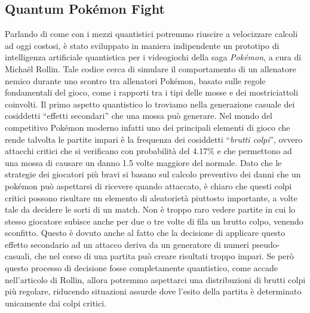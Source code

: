 \documentclass{book}
\theoremstyle{definition}
\theoremstyle{definition}
\theoremstyle{definition}
\theoremstyle{plain}
\theoremstyle{plain}
\theoremstyle{plain}
\theoremstyle{plain}
\begin{document}
\subsection{Quantum Pokémon Fight}
Parlando di come con i mezzi quantistici potremmo riuscire a velocizzare calcoli ad oggi costosi, è stato sviluppato in maniera indipendente un prototipo di intelligenza artificiale quantistica per i videogiochi della saga \emph{Pokémon}\cite{wiki:Pokemon}, a cura di Michaël Rollin\cite{quantum_pokemon_fight}. Tale codice cerca di simulare il comportamento di un allenatore nemico durante uno scontro tra allenatori Pokémon, basato sulle regole fondamentali del gioco, come i rapporti tra i tipi delle mosse e dei mostriciattoli coinvolti. Il primo aspetto quantistico lo troviamo nella generazione casuale dei cosiddetti ``effetti secondari'' che una mossa può generare. Nel mondo del competitivo Pokémon moderno infatti uno dei principali elementi di gioco che rende talvolta le partite impari è la frequenza dei cosiddetti ``\emph{brutti colpi}'', ovvero attacchi critici che si verificano con probabilità del 4.17\%\cite{crit_hit} e che permettono ad una mossa di causare un danno 1.5 volte maggiore del normale. Dato che le strategie dei giocatori più bravi si basano sul calcolo preventivo dei danni che un pokémon può aspettarsi di ricevere quando attaccato, è chiaro che questi colpi critici possono risultare un elemento di aleatorietà piuttosto importante, a volte tale da decidere le sorti di un match. Non è troppo raro vedere partite in cui lo stesso giocatore subisce anche per due o tre volte di fila un brutto colpo, venendo sconfitto. Questo è dovuto anche al fatto che la decisione di applicare questo effetto secondario ad un attacco deriva da un generatore di numeri pseudo-casuali, che nel corso di una partita può creare risultati troppo impari. Se però questo processo di decisione fosse completamente quantistico, come accade nell'articolo di Rollin, allora potremmo aspettarci una distribuzioni di brutti colpi più regolare, riducendo situazioni assurde dove l'esito della partita è determinato unicamente dai colpi critici.\\
\end{document}
